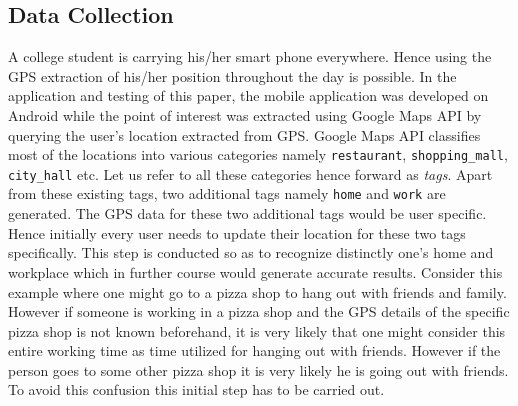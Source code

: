 \documentclass[conference]{IEEEtran}
\begin{document}
\subsection{Data Collection}

A college student is carrying his/her smart phone everywhere. Hence using the GPS extraction of his/her position throughout the day is possible. In the application and testing of this paper, the mobile application was developed on Android while the point of interest was extracted using Google Maps API by querying the user\rq s location extracted from GPS. Google Maps API classifies most of the locations into various categories namely \texttt{restaurant}, \texttt{shopping\_mall}, \texttt{city\_hall} etc. Let us refer to all these categories hence forward as \textit{tags}. Apart from these existing tags, two additional tags namely \texttt{home} and \texttt{work} are generated. The GPS data for these two additional tags would be user specific. Hence initially every user needs to update their location for these two tags specifically. This step is conducted so as to recognize distinctly one\rq s home and workplace which in further course would generate accurate results. Consider this example where one might go to a pizza shop to hang out with friends and family. However if someone is working in a pizza shop and the GPS details of the specific pizza shop is not known beforehand, it is very likely that one might consider this entire working time as time utilized for hanging out with friends. However if the person goes to some other pizza shop it is very likely he is going out with friends. To avoid this confusion this initial step has to be carried out.
\end{document}
